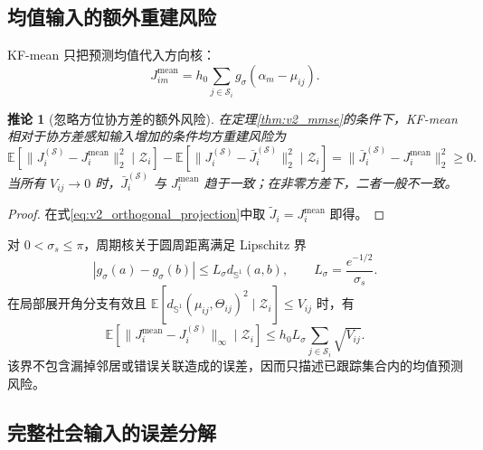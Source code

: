 \documentclass[UTF8,fontset=windows,11pt]{ctexart}
\newtheorem{corollary}[theorem]{推论}
\newcommand{\Sone}{\mathbb S^1}
\newcommand{\E}{\mathbb E}
\begin{document}
\subsection{均值输入的额外重建风险}

KF-mean 只把预测均值代入方向核：
\begin{equation}
 J_{im}^{\mathrm{mean}}=h_0\sum_{j\in\mathcal S_i}
 g_\sigma(\alpha_m-\mu_{ij}).
 \label{eq:v2_mean_input}
\end{equation}

\begin{corollary}[忽略方位协方差的额外风险]
\label{cor:v2_mean_risk}
在定理\ref{thm:v2_mmse}的条件下，KF-mean 相对于协方差感知输入增加的条件均方重建风险为
\begin{equation}
 \E[\|J_i^{(\mathcal S)}-J_i^{\mathrm{mean}}\|_2^2\mid\mathcal Z_i]
 -\E[\|J_i^{(\mathcal S)}-\bar J_i^{(\mathcal S)}\|_2^2\mid\mathcal Z_i]
 =\|\bar J_i^{(\mathcal S)}-J_i^{\mathrm{mean}}\|_2^2\ge0.
 \label{eq:v2_mean_risk_gap}
\end{equation}
当所有 $V_{ij}\to0$ 时，$\bar J_i^{(\mathcal S)}$ 与 $J_i^{\mathrm{mean}}$ 趋于一致；在非零方差下，二者一般不一致。
\end{corollary}

\begin{proof}
在式\eqref{eq:v2_orthogonal_projection}中取 $\widetilde J_i=J_i^{\mathrm{mean}}$ 即得。
\end{proof}

对 $0<\sigma_s\le\pi$，周期核关于圆周距离满足 Lipschitz 界
\begin{equation}
 |g_\sigma(a)-g_\sigma(b)|
 \le L_\sigma d_{\Sone}(a,b),
 \qquad L_\sigma=\frac{e^{-1/2}}{\sigma_s}.
 \label{eq:v2_lipschitz_kernel}
\end{equation}
在局部展开角分支有效且 $\E[d_{\Sone}(\mu_{ij},\Theta_{ij})^2\mid\mathcal Z_i]\le V_{ij}$ 时，有
\begin{equation}
 \E[\|J_i^{\mathrm{mean}}-J_i^{(\mathcal S)}\|_\infty\mid\mathcal Z_i]
 \le h_0L_\sigma\sum_{j\in\mathcal S_i}\sqrt{V_{ij}}.
 \label{eq:v2_mean_bound}
\end{equation}
该界不包含漏掉邻居或错误关联造成的误差，因而只描述已跟踪集合内的均值预测风险。

\subsection{完整社会输入的误差分解}
\end{document}
